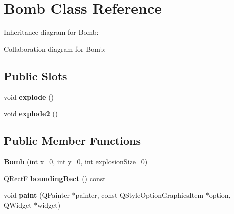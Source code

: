 \hypertarget{class_bomb}{\section{Bomb Class Reference}
\label{class_bomb}
}


Inheritance diagram for Bomb\-:


Collaboration diagram for Bomb\-:
\subsection*{Public Slots}
\begin{DoxyCompactItemize}
\item 
\hypertarget{class_bomb_a5752ce7daece5c3bf2e2178bcfcb820d}{void {\bfseries explode} ()}\label{class_bomb_a5752ce7daece5c3bf2e2178bcfcb820d}

\item 
\hypertarget{class_bomb_ae9410dc9b499dad8e4f0f200d9b0ead7}{void {\bfseries explode2} ()}\label{class_bomb_ae9410dc9b499dad8e4f0f200d9b0ead7}

\end{DoxyCompactItemize}
\subsection*{Public Member Functions}
\begin{DoxyCompactItemize}
\item 
\hypertarget{class_bomb_ada9d05fb30c035691190e80d1d0a1c7f}{{\bfseries Bomb} (int x=0, int y=0, int explosion\-Size=0)}\label{class_bomb_ada9d05fb30c035691190e80d1d0a1c7f}

\item 
\hypertarget{class_bomb_ad047941e8f1413a061f98f460dcea22a}{Q\-Rect\-F {\bfseries bounding\-Rect} () const }\label{class_bomb_ad047941e8f1413a061f98f460dcea22a}

\item 
\hypertarget{class_bomb_ab8e930cc66f5d3f41e8a02f3d0d8185e}{void {\bfseries paint} (Q\-Painter $\ast$painter, const Q\-Style\-Option\-Graphics\-Item $\ast$option, Q\-Widget $\ast$widget)}\label{class_bomb_ab8e930cc66f5d3f41e8a02f3d0d8185e}

\end{DoxyCompactItemize}
